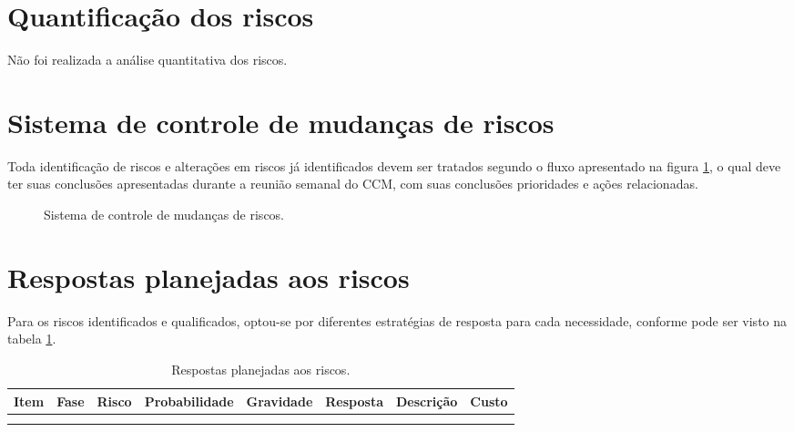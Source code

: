 
\section{Quantificação dos riscos}

Não foi realizada a análise quantitativa dos riscos.

\section{Sistema de controle de mudanças de riscos}
\label{sec:risk-change-control-system}

Toda identificação de riscos e alterações em riscos já identificados devem ser tratados segundo o fluxo apresentado na figura \ref{fig:risk-change-control-system}, o qual deve ter suas conclusões apresentadas durante a reunião semanal do CCM, com suas conclusões prioridades e ações relacionadas.


\begin{figure}[h]
\centering
{}
\caption{Sistema de controle de mudanças de riscos.}
\label{fig:risk-change-control-system}
\end{figure}

\section{Respostas planejadas aos riscos}

Para os riscos identificados e qualificados, optou-se por diferentes estratégias de resposta para cada necessidade, conforme pode ser visto na tabela \ref{tab:risk-answers}.


\begin{longtable}{ l l l l l l l l }
	\toprule
	\textbf{Item} & \textbf{Fase} & \textbf{Risco} & \textbf{Probabilidade} & \textbf{Gravidade} & \textbf{Resposta} & \textbf{Descrição} & \textbf{Custo} \\
	\midrule
	  &   &   &   &   &   &   &   \\
	\bottomrule
	\caption{Respostas planejadas aos riscos.}
	\centering
    \label{tab:risk-answers}
\end{longtable}

